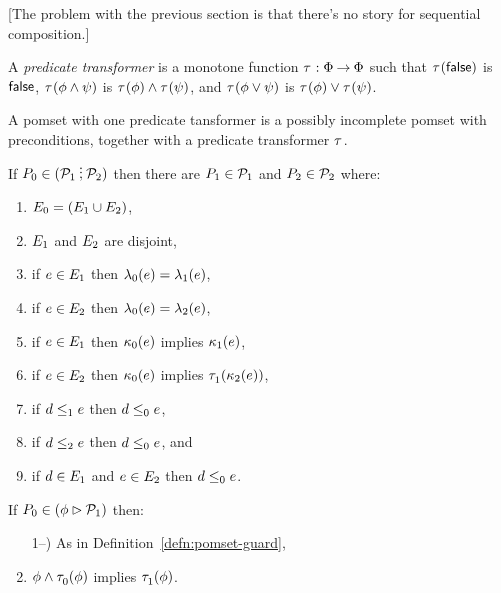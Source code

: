 [The problem with the previous section is that there's no story for sequential composition.]

\begin{definition}
  A \emph{predicate transformer} is a monotone function
  $\tau^{}:\Phi\mathbin\rightarrow\Phi$ such that
  $\tau^{}(\mathsf{false})$ is $\mathsf{false}$,
  $\tau^{}(\phi\land\psi)$ is $\tau^{}(\phi)\land\tau^{}(\psi)$, and
  $\tau^{}(\phi\lor\psi)$ is $\tau^{}(\phi)\lor\tau^{}(\psi)$.
\end{definition}

\begin{definition}
  A pomset with one predicate tansformer is a possibly incomplete
  pomset with preconditions, together with a predicate transformer $\tau^{}$.
\end{definition}

\begin{definition}
  If $\aPS_0 \in (\aPSS_1\sSEMI\aPSS_2)$ then
  there are $P_1\in\mathcal{P}_1$ and $P_2\in\mathcal{P}_2$ where:
  \begin{enumerate}
  \item $E_0 = (E_1\cup E_2)$,
  \item $E_1$ and  $E_2$ are disjoint,
  \item if $e\in E_1$ then $\lambda_0(e) = \lambda_1(e)$, 
  \item if $e\in E_2$ then $\lambda_0(e) = \lambda_2(e)$,
  \item if $e\in E_1$ then $\kappa_0(e)$ implies $\kappa_1(e)$, 
  \item if $e\in E_2$ then $\kappa_0(e)$ implies $\tau^{}_1(\kappa_2(e))$,
  \item if $d\le_1e$ then $d\le_0e$,
  \item if $d\le_2e$ then $d\le_0e$, and
  \item if $d\in E_1$ and $e\in E_2$ then $d\le_0e$.
  \end{enumerate}
\end{definition}

\begin{definition}
  If $P_0 \in (\phi\mathbin\rhd\mathcal{P}_1)$ then:
  \begin{enumerate}
    \setcounter{enumi}{\value{pomsetPreGuardCount}}
  \item[1--\thepomsetPreGuardCount)] As in Definition~\ref{defn:pomset-guard},
  \item $\phi\land\tau^{}_0(\phi)$ implies $\tau^{}_1(\phi)$.
  \end{enumerate}
\end{definition}


